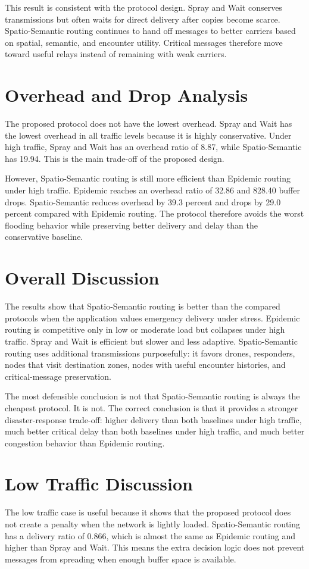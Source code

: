 This result is consistent with the protocol design. Spray and Wait conserves transmissions but often waits for direct delivery after copies become scarce. Spatio-Semantic routing continues to hand off messages to better carriers based on spatial, semantic, and encounter utility. Critical messages therefore move toward useful relays instead of remaining with weak carriers.

\section{Overhead and Drop Analysis}
The proposed protocol does not have the lowest overhead. Spray and Wait has the lowest overhead in all traffic levels because it is highly conservative. Under high traffic, Spray and Wait has an overhead ratio of 8.87, while Spatio-Semantic has 19.94. This is the main trade-off of the proposed design.

However, Spatio-Semantic routing is still more efficient than Epidemic routing under high traffic. Epidemic reaches an overhead ratio of 32.86 and 828.40 buffer drops. Spatio-Semantic reduces overhead by 39.3 percent and drops by 29.0 percent compared with Epidemic routing. The protocol therefore avoids the worst flooding behavior while preserving better delivery and delay than the conservative baseline.

\section{Overall Discussion}
The results show that Spatio-Semantic routing is better than the compared protocols when the application values emergency delivery under stress. Epidemic routing is competitive only in low or moderate load but collapses under high traffic. Spray and Wait is efficient but slower and less adaptive. Spatio-Semantic routing uses additional transmissions purposefully: it favors drones, responders, nodes that visit destination zones, nodes with useful encounter histories, and critical-message preservation.

The most defensible conclusion is not that Spatio-Semantic routing is always the cheapest protocol. It is not. The correct conclusion is that it provides a stronger disaster-response trade-off: higher delivery than both baselines under high traffic, much better critical delay than both baselines under high traffic, and much better congestion behavior than Epidemic routing.

\section{Low Traffic Discussion}
The low traffic case is useful because it shows that the proposed protocol does not create a penalty when the network is lightly loaded. Spatio-Semantic routing has a delivery ratio of 0.866, which is almost the same as Epidemic routing and higher than Spray and Wait. This means the extra decision logic does not prevent messages from spreading when enough buffer space is available.

